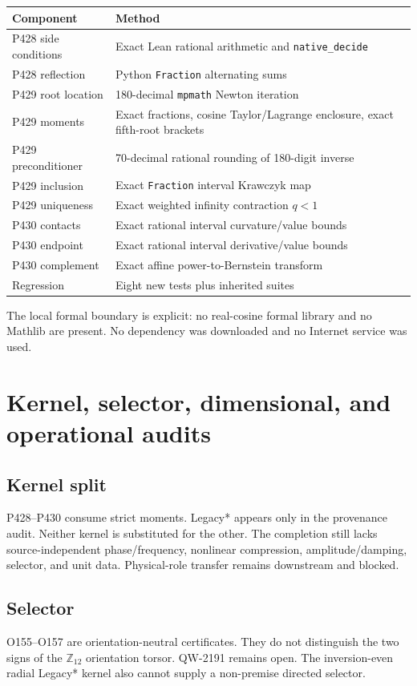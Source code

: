 \documentclass[11pt,a4paper]{article}
\begin{document}
\begin{longtable}{p{}p{}}
\toprule
Component & Method\\\midrule
P428 side conditions & Exact Lean rational arithmetic and \texttt{native\_decide}\\
P428 reflection & Python \texttt{Fraction} alternating sums\\
P429 root location & 180-decimal \texttt{mpmath} Newton iteration\\
P429 moments & Exact fractions, cosine Taylor/Lagrange enclosure, exact fifth-root brackets\\
P429 preconditioner & 70-decimal rational rounding of 180-digit inverse\\
P429 inclusion & Exact \texttt{Fraction} interval Krawczyk map\\
P429 uniqueness & Exact weighted infinity contraction $q<1$\\
P430 contacts & Exact rational interval curvature/value bounds\\
P430 endpoint & Exact rational interval derivative/value bounds\\
P430 complement & Exact affine power-to-Bernstein transform\\
Regression & Eight new tests plus inherited suites\\
\bottomrule
\end{longtable}

The local formal boundary is explicit: no real-cosine formal library and no
Mathlib are present. No dependency was downloaded and no Internet service was
used.

\section{Kernel, selector, dimensional, and operational audits}

\subsection{Kernel split}
P428--P430 consume strict moments. Legacy* appears only in the provenance
audit. Neither kernel is substituted for the other. The completion still
lacks source-independent phase/frequency, nonlinear compression,
amplitude/damping, selector, and unit data. Physical-role transfer remains
downstream and blocked.

\subsection{Selector}
O155--O157 are orientation-neutral certificates. They do not distinguish the
two signs of the $\mathbb Z_{12}$ orientation torsor. QW-2191 remains open.
The inversion-even radial Legacy* kernel also cannot supply a non-premise
directed selector.
\end{document}
